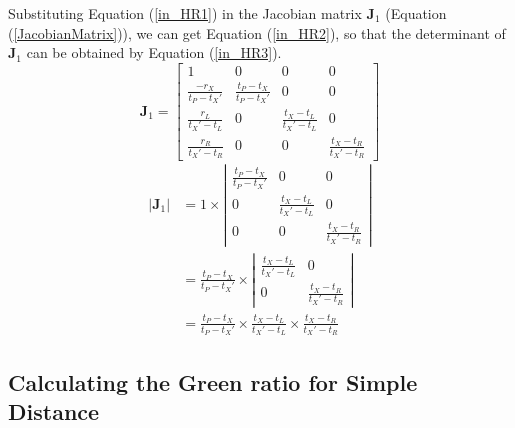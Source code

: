 \documentclass{bmcart}
\begin{document}
\begin{backmatter}
Substituting Equation (\ref{in_HR1}) in the Jacobian matrix ${{\mathbf{J}}_1}$ (Equation (\ref{JacobianMatrix})), we can get Equation (\ref{in_HR2}), so that the determinant of ${{\mathbf{J}}_1}$ can be obtained by Equation (\ref{in_HR3}).
\begin{equation}\label{in_HR2}
{{\mathbf{J}}_1} = \left[ {\begin{array}{*{20}{c}}
  1&0&0&0 \\
  {\frac{{ - {r_X}}}{{{t_P} - {t_X}'}}}&{\frac{{{t_P} - {t_X}}}{{{t_P} - {t_X}'}}}&0&0 \\
  {\frac{{{r_L}}}{{{t_X}' - {t_L}}}}&0&{\frac{{{t_X} - {t_L}}}{{{t_X}' - {t_L}}}}&0 \\
  {\frac{{{r_R}}}{{{t_X}' - {t_R}}}}&0&0&{\frac{{{t_X} - {t_R}}}{{{t_X}' - {t_R}}}}
\end{array}} \right]
\end{equation}
\begin{equation}\label{in_HR3}
\begin{aligned}
\left| {{{\mathbf{J}}_1}} \right| &= 1 \times \left| {\begin{array}{*{20}{c}}
  {\frac{{{t_P} - {t_X}}}{{{t_P} - {t_X}'}}}&0&0 \\
  0&{\frac{{{t_X} - {t_L}}}{{{t_X}' - {t_L}}}}&0 \\
  0&0&{\frac{{{t_X} - {t_R}}}{{{t_X}' - {t_R}}}}
\end{array}} \right| \\&= \frac{{{t_P} - {t_X}}}{{{t_P} - {t_X}'}} \times \left| {\begin{array}{*{20}{c}}
  {\frac{{{t_X} - {t_L}}}{{{t_X}' - {t_L}}}}&0 \\
  0&{\frac{{{t_X} - {t_R}}}{{{t_X}' - {t_R}}}}
\end{array}} \right| \\&= \frac{{{t_P} - {t_X}}}{{{t_P} - {t_X}'}} \times \frac{{{t_X} - {t_L}}}{{{t_X}' - {t_L}}} \times \frac{{{t_X} - {t_R}}}{{{t_X}' - {t_R}}}
\end{aligned}
\end{equation}

\subsection*{Calculating the Green ratio for Simple Distance}


\end{backmatter}
\end{document}
